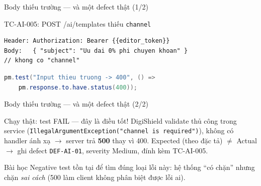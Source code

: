 \documentclass[aspectratio=169,12pt]{beamer}
\begin{document}
\begin{frame}[fragile]{Body thiếu trường --- và một defect thật (1/2)}
  \begin{block}{TC-AI-005: POST /ai/templates thiếu \texttt{channel}}
\begin{lstlisting}[language={}]
Header: Authorization: Bearer {{editor_token}}
Body:   { "subject": "Uu dai 0% phi chuyen khoan" }
// khong co "channel"
\end{lstlisting}
\begin{lstlisting}[language=Java]
pm.test("Input thieu truong -> 400", () =>
    pm.response.to.have.status(400));
\end{lstlisting}
  \end{block}
\end{frame}

\begin{frame}{Body thiếu trường --- và một defect thật (2/2)}
  \begin{alertblock}{Chạy thật: test FAIL --- đây là điều tốt!}
    DigiShield validate thủ công trong service
    (\texttt{IllegalArgumentException("channel is required")}),
    không có handler ánh xạ $\to$ server trả \textbf{500} thay vì 400.
    Expected (theo đặc tả) $\ne$ Actual $\to$ ghi defect
    \texttt{DEF-AI-01}, severity Medium, đính kèm TC-AI-005.
  \end{alertblock}

  \begin{exampleblock}{Bài học}
    Negative test tồn tại để tìm đúng loại lỗi này: hệ thống ``có chặn''
    nhưng chặn \emph{sai cách} (500 làm client không phân biệt được lỗi ai).
  \end{exampleblock}
\end{frame}
\end{document}
